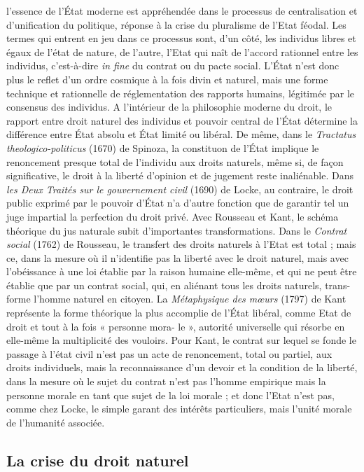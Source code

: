 l'essence de l’État moderne est appréhendée dans le processus de centralisation et
d’unification du politique, réponse à la
crise du pluralisme de l'Etat féodal. Les
termes qui entrent en jeu dans ce processus sont, d’un côté, les individus libres et
égaux de l’état de nature, de l’autre, l'Etat
qui naît de l’accord rationnel entre les
individus, c’est-à-dire {\it in fine} du contrat ou
%
du pacte social. L'État n’est donc plus le
reflet d’un ordre cosmique à la fois divin
et naturel, mais une forme technique et
rationnelle de réglementation des rapports humains, légitimée par le consensus
des individus. A l’intérieur de la philosophie moderne du droit, le rapport entre
droit naturel des individus et pouvoir central de l'État détermine la différence
entre État absolu et État limité ou libéral.
De même, dans le {\it Tractatus theologico-politicus} (1670) de Spinoza, la constituon de l’État implique le renoncement
presque total de l'individu aux droits
naturels, même si, de façon significative,
le droit à la liberté d’opinion et de jugement reste inaliénable. Dans {\it les Deux
Traités sur le gouvernement civil} (1690) de
Locke, au contraire, le droit public
exprimé par le pouvoir d’État n’a d’autre
fonction que de garantir tel un juge
impartial la perfection du droit privé.
Avec Rousseau et Kant, le schéma théorique du jus naturale subit d’importantes
transformations. Dans le {\it Contrat social}
(1762) de Rousseau, le transfert des droits
naturels à l'Etat est total ; mais ce, dans
la mesure où il n’identifie pas la liberté
avec le droit naturel, mais avec l’obéissance à une loi établie par la raison
humaine elle-même, et qui ne peut être
établie que par un contrat social, qui, en
aliénant tous les droits naturels, trans-
forme l’homme naturel en citoyen. La
{\it Métaphysique des mœurs} (1797) de Kant
représente la forme théorique la plus
accomplie de l’État libéral, comme Etat
de droit et tout à la fois « personne mora-
le », autorité universelle qui résorbe en
elle-même la multiplicité des vouloirs.
Pour Kant, le contrat sur lequel se fonde
le passage à l’état civil n’est pas un acte de
renoncement, total ou partiel, aux droits
individuels, mais la reconnaissance d’un
devoir et la condition de la liberté, dans
la mesure où le sujet du contrat n’est pas
l'homme empirique mais la personne
morale en tant que sujet de la loi morale ;
et donc l'Etat n’est pas, comme chez
Locke, le simple garant des intérêts particuliers, mais l’unité morale de l’humanité
associée.

\subsection{La crise du droit naturel}

